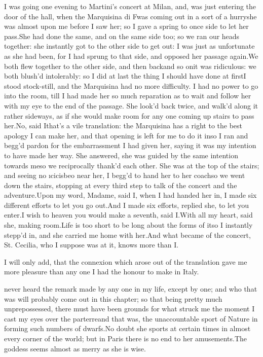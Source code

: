 \documentclass[twoside]{article}
\begin{document}
I was going one evening to Martini’s concert at Milan, and, was just
entering the door of the hall, when the Marquisina di F\tsk  was coming out
in a sort of a hurry\tsk she was almost upon me before I saw her; so I gave
a spring to once side to let her pass.\tsk She had done the same, and on the
same side too; so we ran our heads together: she instantly got to the
other side to get out: I was just as unfortunate as she had been, for I
had sprung to that side, and opposed her passage again.\tsk We both flew
together to the other side, and then back\tsk and so on\tsk it was ridiculous:
we both blush’d intolerably: so I did at last the thing I should have
done at first\tsk I stood stock-still, and the Marquisina had no more
difficulty.  I had no power to go into the room, till I had made her so
much reparation as to wait and follow her with my eye to the end of the
passage.  She look’d back twice, and walk’d along it rather sideways, as
if she would make room for any one coming up stairs to pass her.\tsk No, said
I\tsk that’s a vile translation: the Marquisina has a right to the best
apology I can make her, and that opening is left for me to do it in\tsk so I
ran and begg’d pardon for the embarrassment I had given her, saying it
was my intention to have made her way.  She answered, she was guided by
the same intention towards me\tsk so we reciprocally thank’d each other.
She was at the top of the stairs; and seeing no \i{cicisbeo} near her, I
begg’d to hand her to her coach\tsk so we went down the stairs, stopping at
every third step to talk of the concert and the adventure.\tsk Upon my word,
Madame, said I, when I had handed her in, I made six different efforts to
let you go out.\tsk And I made six efforts, replied she, to let you enter.\tsk I
wish to heaven you would make a seventh, said I.\tsk With all my heart, said
she, making room.\tsk Life is too short to be long about the forms of it\tsk so
I instantly stepp’d in, and she carried me home with her.\tsk And what became
of the concert, St. Cecilia, who I suppose was at it, knows more than I.

I will only add, that the connexion which arose out of the translation
gave me more pleasure than any one I had the honour to make in Italy.






 never heard the remark made by any one in my life, except by one;
and who that was will probably come out in this chapter; so that being
pretty much unprepossessed, there must have been grounds for what struck
me the moment I cast my eyes over the parterre\tsk and that was, the
unaccountable sport of Nature in forming such numbers of dwarfs.\tsk No doubt
she sports at certain times in almost every corner of the world; but in
Paris there is no end to her amusements.\tsk The goddess seems almost as
merry as she is wise.
\end{document}
